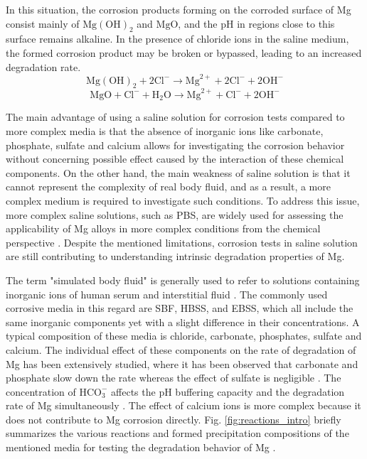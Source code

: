 In this situation, the corrosion products forming on the corroded surface of Mg consist mainly of $\mathrm{Mg}(\mathrm{OH})_{2}$ and $\mathrm{MgO}$, and the pH in regions close to this surface remains alkaline. In the presence of chloride ions in the saline medium, the formed corrosion product may be broken or bypassed, leading to an increased degradation rate.
\begin{equation} \label{eq:break_react_intro}
\mathrm{Mg}(\mathrm{OH})_{2}+2 \mathrm{Cl}^{-} \rightarrow \mathrm{Mg}^{2+}+2 \mathrm{Cl}^{-}+2 \mathrm{OH}^{-}
\end{equation}
\begin{equation} \label{eq:break_react_mgo_intro}
\mathrm{MgO}+ \mathrm{Cl}^{-} + \mathrm{H}_{2} \mathrm{O} \rightarrow \mathrm{Mg}^{2+}+ \mathrm{Cl}^{-}+ 2\mathrm{OH}^{-}
\end{equation}


The main advantage of using a saline solution for corrosion tests compared to more complex media is that the absence of inorganic ions like carbonate, phosphate, sulfate and calcium allows for investigating the corrosion behavior without concerning possible effect caused by the interaction of these chemical components. On the other hand, the main weakness of saline solution is that it cannot represent the complexity of real body fluid, and as a result, a more complex medium is required to investigate such conditions. To address this issue, more complex saline solutions, such as PBS, are widely used for assessing the applicability of Mg alloys in more complex conditions from the chemical perspective \cite{Schille2011,Xue2012}. Despite the mentioned limitations, corrosion tests in saline solution are still contributing to understanding intrinsic degradation properties of Mg. 


The term "simulated body fluid" is generally used to refer to solutions containing inorganic ions of human serum and interstitial fluid \cite{Mei2020}. The commonly used corrosive media in this regard are \gls{SBF}, \gls{HBSS}, and \gls{EBSS}, which all include the same inorganic components yet with a slight difference in their concentrations. A typical composition of these media is chloride, carbonate, phosphates, sulfate and calcium. The individual effect of these components on the rate of degradation of Mg has been extensively studied, where it has been observed that carbonate and phosphate slow down the rate whereas the effect of sulfate is negligible \cite{Johnston2017,Mei2019a}. The concentration of $\mathrm{HCO}_{3}^{-}$ affects the pH buffering capacity and the degradation rate of Mg simultaneously \cite{Xin2011}. The effect of calcium ions is more complex because it does not contribute to Mg corrosion directly. Fig. \ref{fig:reactions_intro} briefly summarizes the various reactions and formed precipitation compositions of the mentioned media for testing the degradation behavior of Mg \cite{Mei2020}.


